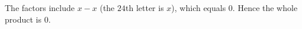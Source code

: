 The factors include $x-x$ (the $24$th letter is $x$), which equals $0$. Hence the whole product is $\boxed{0}$.
